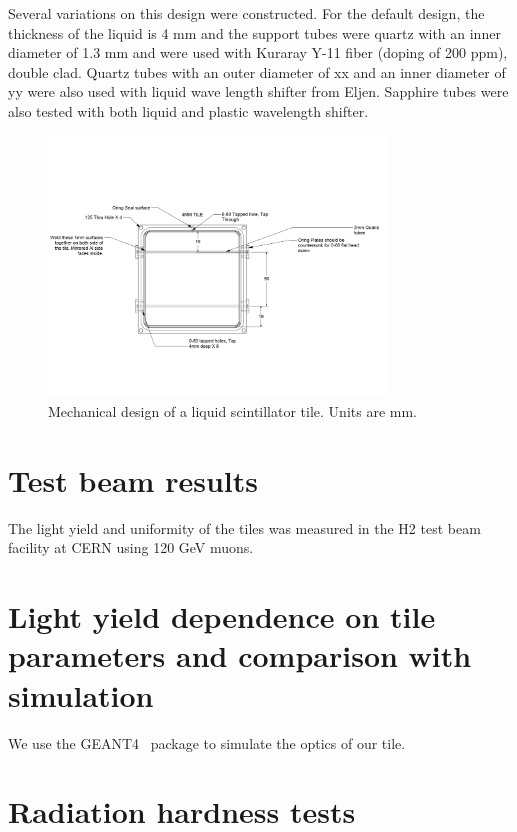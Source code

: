 \documentclass[review]{elsarticle}
\begin{document}
Several variations on this design were constructed.  For the default design, the thickness of the liquid is 4 mm and the support tubes were quartz with an inner diameter of 1.3 mm and were used with Kuraray Y-11 fiber (doping of 200 ppm), double clad.  Quartz tubes with an outer diameter of xx and an inner diameter of yy were also used with liquid wave length shifter from Eljen.
Sapphire tubes were also tested with both liquid and plastic wavelength shifter.


\begin{figure}[!ht]
\begin{center}
\includegraphics[width=0.8\textwidth]{mechanicaldesign.pdf}
\caption{
Mechanical design of a liquid scintillator tile.  Units are mm.
}
\label{fig:tiledesign}
\end{center}
\end{figure}



\section{Test beam results}

The light yield and uniformity of the tiles was measured in the H2 test beam facility at CERN using 120 GeV muons.

\section{Light yield dependence on tile parameters and comparison with simulation}
We use the GEANT4~\cite{Agostinelli2003250} package to simulate the optics of our tile.  

\section{Radiation hardness tests}
\end{document}
